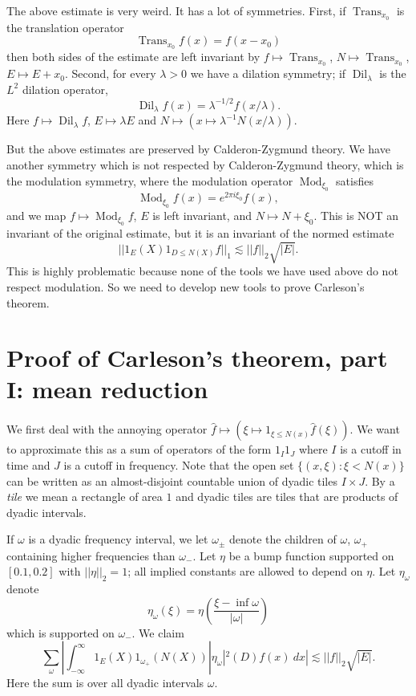 \documentclass[12pt]{report}
\DeclareMathOperator*{\Dil}{Dil}
\DeclareMathOperator*{\Mod}{Mod}
\DeclareMathOperator*{\Trans}{Trans}
\newcommand{\dfn}[1]{\emph{#1}\index{#1}}
\theoremstyle{definition}
\begin{document}
The above estimate is very weird. It has a lot of symmetries. First, if $\Trans_{x_0}$ is the translation operator
$$\Trans_{x_0} f(x) = f(x - x_0)$$
then both sides of the estimate are left invariant by $f \mapsto \Trans_{x_0}$, $N \mapsto \Trans_{x_0}$, $E \mapsto E + x_0$.
Second, for every $\lambda > 0$ we have a dilation symmetry; if $\Dil_\lambda$ is the $L^2$ dilation operator,
$$\Dil_\lambda f(x) = \lambda^{-1/2}f(x/\lambda).$$
Here $f \mapsto \Dil_\lambda f$, $E \mapsto \lambda E$ and $N \mapsto (x \mapsto \lambda^{-1}N(x/\lambda))$.

But the above estimates are preserved by Calderon-Zygmund theory. We have another symmetry which is not respected by Calderon-Zygmund theory, which is the modulation symmetry, where the modulation operator $\Mod_{\xi_0}$ satisfies
$$\Mod_{\xi_0}f(x) = e^{2\pi i\xi_0} f(x),$$
and we map $f \mapsto \Mod_{\xi_0}f$, $E$ is left invariant, and $N \mapsto N + \xi_0$. This is NOT an invariant of the original estimate, but it is an invariant of the normed estimate
$$||1_E(X)1_{D\leq N(X)}f||_1 \lesssim ||f||_2\sqrt{|E|}.$$
This is highly problematic because none of the tools we have used above do not respect modulation. So we need to develop new tools to prove Carleson's theorem.

\section{Proof of Carleson's theorem, part I: mean reduction}
We first deal with the annoying operator $\hat f \mapsto (\xi \mapsto 1_{\xi \leq N(x)}\hat f(\xi))$.
We want to approximate this as a sum of operators of the form $1_I1_J$ where $I$ is a cutoff in time and $J$ is a cutoff in frequency.
Note that the open set $\{(x, \xi): \xi < N(x)\}$ can be written as an almost-disjoint countable union of dyadic tiles $I \times J$.
By a \dfn{tile} we mean a rectangle of area $1$ and dyadic tiles are tiles that are products of dyadic intervals.

If $\omega$ is a dyadic frequency interval, we let $\omega_\pm$ denote the children of $\omega$, $\omega_+$ containing higher frequencies than $\omega_-$.
Let $\eta$ be a bump function supported on $[0.1, 0.2]$ with $||\eta||_2 = 1$; all implied constants are allowed to depend on $\eta$.
Let $\eta_\omega$ denote
$$\eta_\omega(\xi) = \eta(\frac{\xi - \inf \omega}{|\omega|})$$
which is supported on $\omega_-$.
We claim
$$\sum_\omega |\int_{-\infty}^\infty 1_E(X)1_{\omega_+}(N(X))|\eta_\omega|^2(D)f(x) ~dx| \lesssim ||f||_2 \sqrt{|E|}.$$
Here the sum is over all dyadic intervals $\omega$.
\end{document}
